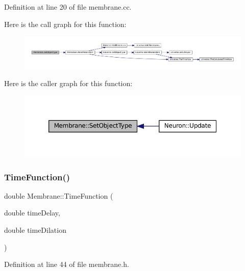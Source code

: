 Definition at line 20 of file membrane.\+cc.

Here is the call graph for this function\+:\nopagebreak
\begin{figure}[H]
\begin{center}
\leavevmode
\includegraphics[width=350pt]{class_membrane_a5ba2bcb906f3984b28f1030207e106ad_cgraph}
\end{center}
\end{figure}
Here is the caller graph for this function\+:\nopagebreak
\begin{figure}[H]
\begin{center}
\leavevmode
\includegraphics[width=350pt]{class_membrane_a5ba2bcb906f3984b28f1030207e106ad_icgraph}
\end{center}
\end{figure}
\mbox{\label{class_membrane_a8c3593b0747495c412bf2d99b7b10104}} 
\subsubsection{\texorpdfstring{Time\+Function()}{TimeFunction()}}
{\footnotesize\ttfamily double Membrane\+::\+Time\+Function (\begin{DoxyParamCaption}\item[{double}]{time\+Delay,  }\item[{double}]{time\+Dilation }\end{DoxyParamCaption})\hspace{0.3cm}{\ttfamily [inline]}}



Definition at line 44 of file membrane.\+h.

\mbox{\label{class_membrane_a4af9710ea7f0bc6f1b6b6b6462612d51}} 
